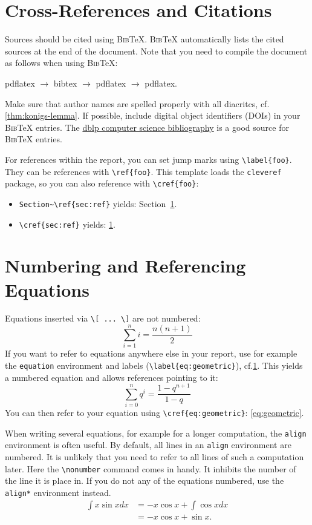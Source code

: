 \documentclass[a4paper,11pt,DIV=15]{scrartcl} %
\theoremstyle{plain}
\theoremstyle{definition}
\begin{document}
\section{Cross-References and Citations}\label{sec:ref}
Sources should be cited using \textsc{Bib}\TeX{}. \textsc{Bib}\TeX{}
automatically lists the cited sources at the end of the document. Note that
you need to compile the document as follows when using \textsc{Bib}\TeX{}:
\begin{center}
	pdflatex $\to$ bibtex $\to$ pdflatex $\to$ pdflatex.
\end{center}
Make sure that author names are spelled properly with all diacritcs, cf.\@ \cref{thm:konigs-lemma}. 
If possible, include digital object identifiers (DOIs) in your \textsc{Bib}\TeX{} entries.
The \href{https://dblp.uni-trier.de/}{dblp computer science bibliography}
is a good source for \textsc{Bib}\TeX{} entries.

For references within the report, you can set jump marks using 
\verb|\label{foo}|. They can be references with \verb|\ref{foo}|. This template
loads the \verb|cleveref| package, so you can also reference with 
\verb|\cref{foo}|:
\begin{itemize}
	\item \verb|Section~\ref{sec:ref}| yields: Section~\ref{sec:ref}.
	\item \verb|\cref{sec:ref}| yields: \cref{sec:ref}.
\end{itemize}


\section{Numbering and Referencing Equations}

Equations inserted via \verb|\[ ... \]| are not numbered:
\[
\sum_{i=1}^n i = \frac{n(n+1)}{2}
\]
If you want to refer to equations anywhere else in your report, use for example
the \verb|equation| environment and labels (\verb|\label{eq:geometric}|), cf.\@ \cref{sec:ref}.
This yields a numbered equation and allows references pointing to it:
\begin{equation} \label{eq:geometric}
\sum_{i=0}^n q^i = \frac{1 - q^{n+1}}{1-q} 
\end{equation}
You can then refer to your equation using \verb|\cref{eq:geometric}|: \cref{eq:geometric}.

When writing several equations, for example for a longer computation, the \verb|align|
environment is often useful. By default, all lines in an \verb|align| environment are
numbered. It is unlikely that you need to refer to all lines of such a computation later.
Here the \verb|\nonumber| command comes in handy. It inhibits the number of the line it is
place in. If you do not any of the equations numbered, use the \verb|align*| environment
instead.
\begin{align}
\int x \sin x dx 
&= - x \cos x + \int \cos x dx \nonumber \\
&= - x \cos x + \sin x.
\end{align}


\clearpage



\end{document}
